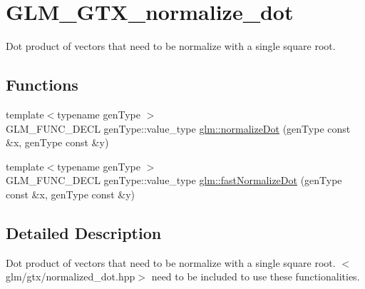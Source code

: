 \hypertarget{group__gtx__normalize__dot}{\section{G\-L\-M\-\_\-\-G\-T\-X\-\_\-normalize\-\_\-dot}
\label{group__gtx__normalize__dot}
}


Dot product of vectors that need to be normalize with a single square root.  


\subsection*{Functions}
\begin{DoxyCompactItemize}
\item 
{\footnotesize template$<$typename gen\-Type $>$ }\\G\-L\-M\-\_\-\-F\-U\-N\-C\-\_\-\-D\-E\-C\-L gen\-Type\-::value\-\_\-type \hyperlink{group__gtx__normalize__dot_ga13b81f0882c1811cb6c99a5864b9c152}{glm\-::normalize\-Dot} (gen\-Type const \&x, gen\-Type const \&y)
\item 
{\footnotesize template$<$typename gen\-Type $>$ }\\G\-L\-M\-\_\-\-F\-U\-N\-C\-\_\-\-D\-E\-C\-L gen\-Type\-::value\-\_\-type \hyperlink{group__gtx__normalize__dot_gaeb26ec35a51c30dbd0d91f9da45eeafe}{glm\-::fast\-Normalize\-Dot} (gen\-Type const \&x, gen\-Type const \&y)
\end{DoxyCompactItemize}


\subsection{Detailed Description}
Dot product of vectors that need to be normalize with a single square root. $<$glm/gtx/normalized\-\_\-dot.\-hpp$>$ need to be included to use these functionalities. 

